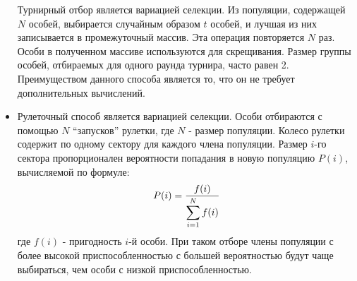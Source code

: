 \begin{itemize}[label=$\ast$]
Турнирный отбор является вариацией селекции. Из популяции, содержащей $N$ особей, выбирается случайным образом $t$ особей, и лучшая из них записывается в промежуточный массив. Эта операция повторяется $N$ раз. Особи в полученном массиве используются для скрещивания. 
Размер группы особей, отбираемых для одного раунда турнира, часто равен 2. 
Преимуществом данного способа является то, что он не требует дополнительных вычислений.
	\item {}

Рулеточный способ является вариацией селекции. Особи отбираются с помощью $N$ ``запусков'' рулетки, где $N$ - размер популяции. Колесо рулетки содержит по одному сектору для каждого члена популяции. Размер $i$-го сектора пропорционален вероятности попадания в новую популяцию $P(i)$, вычисляемой по формуле:
\begin{eqnarray*}
	P(i) = \frac{f(i)}{\displaystyle \sum\displaylimits_{i=1}^{N} f(i)}
\end{eqnarray*}
где $f(i)$ - пригодность $i$-й особи.
При таком отборе члены популяции с более высокой приспособленностью с большей вероятностью будут чаще выбираться, чем особи с низкой приспособленностью.
\end{itemize}

